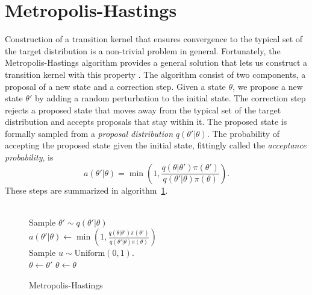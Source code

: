 \section{Metropolis-Hastings}
Construction of a transition kernel that ensures convergence to the typical set of the target distribution is a non-trivial problem in general.
Fortunately, the Metropolis-Hastings algorithm provides a general solution that lets us construct 
a transition kernel with this property \cite{metropolis,metropolis_two}. 
The algorithm consist of two components, a proposal of a new state and a correction step.
Given a state $\theta$, we propose a new state $\theta'$ by adding a random perturbation to the initial state.
The correction step rejects a proposed state that moves away from the typical set of the target distribution
and accepts proposals that stay within it.
The proposed state is formally sampled from a \textit{proposal distribution} $q(\theta'|\theta)$.
The probability of accepting the proposed state given the initial state, fittingly called the \textit{acceptance probability}, is 
\begin{equation}\label{eq:general_acceptance_prob}
    a(\theta'|\theta) = \min \left(1, \frac{q(\theta|\theta')\pi(\theta')}{q(\theta'|\theta)\pi (\theta)}\right).
\end{equation}
These steps are summarized in algorithm~\ref{algo:general_metropolis}.
\begin{figure}[H]
    \begin{algorithm}[H]
      \caption{Metropolis-Hastings}\label{algo:general_metropolis}
      \begin{algorithmic}
        \\
        \State Sample $\theta' \sim q(\theta'|\theta)$\\
        \State $\displaystyle{a(\theta'|\theta) \leftarrow \min \left(1, \frac{q(\theta|\theta')\pi(\theta')}{q(\theta'|\theta)\pi (\theta)}\right)}$\\
        \State Sample $u \sim \text{Uniform}(0,1)$. \\
          \State $\theta \leftarrow \theta'$ 
        \Else
          \State $\theta \leftarrow \theta$  
        \EndIf\\
        \EndProcedure
      \end{algorithmic}
    \end{algorithm}
  \end{figure}

